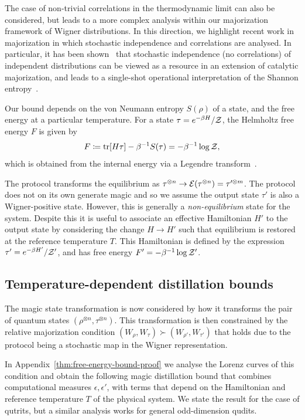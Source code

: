 \documentclass[pra,
aps,
twocolumn,
superscriptaddress,
groupedaddress,
nofootinbib,
reprint
]{revtex4-1}
\begin{document}
The case of non-trivial correlations in the thermodynamic limit can also be considered, but leads to a more complex analysis within our majorization framework of Wigner distributions. In this direction, we highlight recent work in majorization in which stochastic independence and correlations are analysed. In particular, it has been shown~\cite{muller_2015} that stochastic independence (no correlations) of independent distributions can be viewed as a resource in an extension of catalytic majorization, and leads to a single-shot operational interpretation of the Shannon entropy~\cite{muller_2016, muller_2019}.

Our bound depends on the von Neumann entropy $S(\rho)$ of a state, and the free energy at a particular temperature.
For a state $\tau = e^{-\beta H}/\mathcal{Z}$, the Helmholtz free energy $F$ is given by
\begin{equation}
	F \coloneqq \mbox{tr}[H \tau] - \beta^{-1}S(\tau) = -\beta^{-1}\log{\mathcal{Z}},
\end{equation}
which is obtained from the internal energy via a Legendre transform~\cite{Pathria_1997}.

The protocol transforms the equilibrium as $\tau^{\otimes n} \rightarrow {\mathcal E}(\tau^{\otimes n}) = \tau^{\prime \otimes m}$.  The protocol does not on its own generate magic and so we assume the output state $\tau'$ is also a Wigner-positive state. However, this is generally a \emph{non-equilibrium} state for the system. Despite this it is useful to associate an effective Hamiltonian $H'$ to the output state by considering the change $H \rightarrow H'$ such that equilibrium is restored at the reference temperature $T$. This Hamiltonian is defined by the expression $\tau' = e^{-\beta H'}/\mathcal{Z}'$, and has free energy $F' = -\beta^{-1} \log \mathcal{Z}'$. 

\subsection{Temperature-dependent distillation bounds}

The magic state transformation is now considered by how it transforms the pair of quantum states $(\rho^{\otimes n}, \tau^{\otimes n})$. This transformation is then constrained by the relative majorization condition $(W_{\rho}, W_\tau) \succ (W_{\rho'}, W_{\tau'})$ that holds due to the protocol being a stochastic map in the Wigner representation.

In Appendix~\ref{thm:free-energy-bound-proof} we analyse the Lorenz curves of this condition and obtain the following magic distillation bound that combines computational measures $\epsilon,\epsilon'$, with terms that depend on the Hamiltonian and reference temperature $T$ of the physical system. We state the result for the case of qutrits, but a similar analysis works for general odd-dimension qudits.
\end{document}
